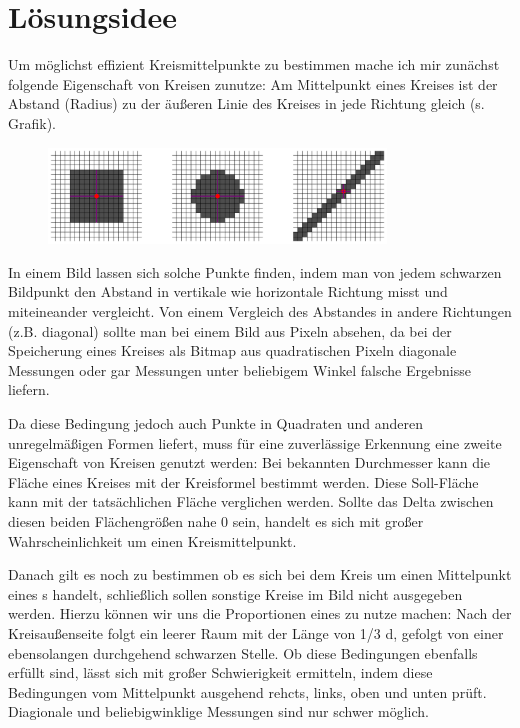 \section{Lösungsidee}
Um möglichst effizient Kreismittelpunkte zu bestimmen mache ich mir zunächst folgende Eigenschaft von Kreisen zunutze: Am Mittelpunkt eines Kreises ist der Abstand (Radius) zu der äußeren Linie des Kreises in jede Richtung gleich (s. Grafik).

\begin{figure}[!ht]
	\centering	
	\includegraphics[width=0.8\textwidth]{durchmesservergleich}
	\label{Verschiedene Formen mit eingezeichnetem Mittelpunkt nach erstem Kriterium}
\end{figure}

In einem Bild lassen sich solche Punkte finden, indem man von jedem schwarzen Bildpunkt den Abstand in vertikale wie horizontale Richtung misst und miteineander vergleicht. Von einem Vergleich des Abstandes in andere Richtungen (z.B. diagonal) sollte man bei einem Bild aus Pixeln absehen, da bei der Speicherung eines Kreises als Bitmap aus quadratischen Pixeln diagonale Messungen oder gar Messungen unter beliebigem Winkel falsche Ergebnisse liefern.

Da diese Bedingung jedoch auch Punkte in Quadraten und anderen unregelmäßigen Formen liefert, muss für eine zuverlässige Erkennung eine zweite Eigenschaft von Kreisen genutzt werden: Bei bekannten Durchmesser kann die Fläche eines Kreises mit der Kreisformel bestimmt werden. Diese Soll-Fläche kann mit der tatsächlichen Fläche verglichen werden. Sollte das Delta zwischen diesen beiden Flächengrößen nahe 0 sein, handelt es sich mit großer Wahrscheinlichkeit um einen Kreismittelpunkt.

Danach gilt es noch zu bestimmen ob es sich bei dem Kreis um einen Mittelpunkt eines \task{}s handelt, schließlich sollen sonstige Kreise im Bild nicht ausgegeben werden. Hierzu können wir uns die Proportionen eines  zu nutze machen: Nach der Kreisaußenseite folgt ein leerer Raum mit der Länge von 1/3 d, gefolgt von einer ebensolangen durchgehend schwarzen Stelle. Ob diese Bedingungen ebenfalls erfüllt sind, lässt sich mit großer Schwierigkeit ermitteln, indem diese Bedingungen vom Mittelpunkt ausgehend rehcts, links, oben und unten prüft. Diagionale und beliebigwinklige Messungen sind nur schwer möglich.


